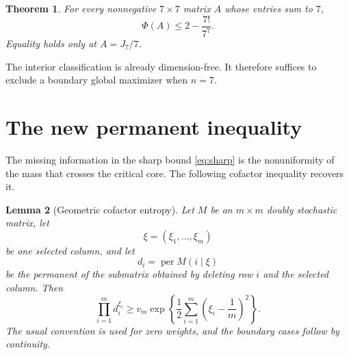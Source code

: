 \documentclass[11pt]{article}
\newtheorem{theorem}{Theorem}[section]
\newtheorem{lemma}[theorem]{Lemma}
\theoremstyle{definition}
\newcommand{\per}{\operatorname{per}}
\begin{document}
\begin{theorem}\label{thm:n7}
For every nonnegative $7\times7$ matrix $A$ whose entries sum to $7$,
\[
 \Phi(A)\le 2-\frac{7!}{7^7}.
\]
Equality holds only at $A=J_7/7$.
\end{theorem}

The interior classification is already dimension-free.  It therefore suffices to exclude a boundary global maximizer when $n=7$.

\section{The new permanent inequality}

The missing information in the sharp bound \eqref{eq:sharp} is the nonuniformity of the mass that crosses the critical core.  The following cofactor inequality recovers it.

\begin{lemma}[Geometric cofactor entropy]\label{lem:cofactor}
Let $M$ be an $m\times m$ doubly stochastic matrix, let
\[
 \xi=(\xi_1,\ldots,\xi_m)
\]
be one selected column, and let
\[
 d_i=\per M(i\mid \xi)
\]
be the permanent of the submatrix obtained by deleting row $i$ and the selected column.  Then
\[
 \prod_{i=1}^m d_i^{\xi_i}
 \ge
 v_m\exp\!\left\{
 \frac12\sum_{i=1}^m\left(\xi_i-\frac1m\right)^2
 \right\}.
 \tag{2.1}\label{eq:cofactor}
\]
The usual convention is used for zero weights, and the boundary cases follow by continuity.
\end{lemma}
\end{document}
